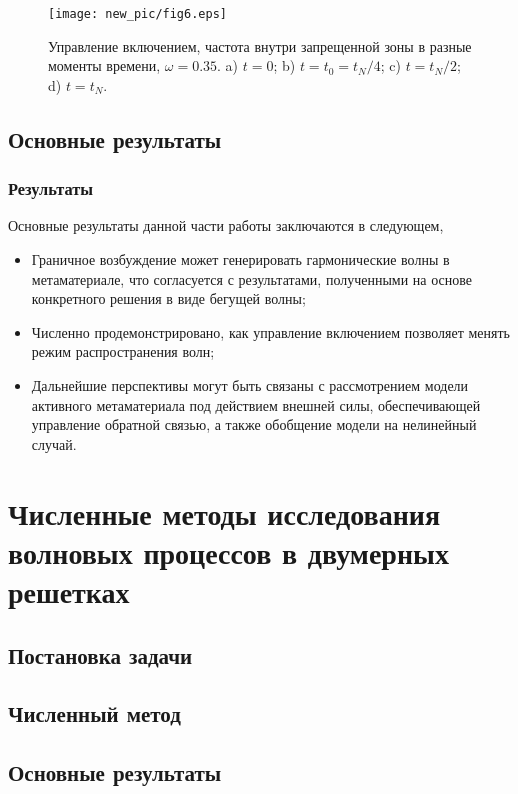 \begin{frame}
	\begin{figure}
		\begin{center}
			\texttt{[image: new\_pic/fig6.eps]}
		\end{center}
		Управление включением, частота внутри запрещенной зоны в разные моменты времени, $\omega = 0.35$.  a) $t=0$; b) $ t=t_0=t_N/4$; c) $t=t_N/2$; d) $t=t_N$.
	\end{figure}
\end{frame}

\subsection{Основные результаты}
\begin{frame}
	\frametitle{Результаты}
	Основные результаты данной части работы заключаются в следующем,
	\begin{itemize}
		\item{Граничное возбуждение может генерировать гармонические волны в метаматериале, что согласуется с результатами, полученными на основе конкретного решения в виде бегущей волны;}
		\item{Численно продемонстрировано, как управление включением позволяет менять режим распространения волн;}
		\item{Дальнейшие перспективы могут быть связаны с рассмотрением модели активного метаматериала под действием внешней силы, обеспечивающей управление обратной связью, а также обобщение модели на нелинейный случай.}
	\end{itemize}
\end{frame}

\section{Численные методы исследования волновых процессов в двумерных решетках}
\subsection{Постановка задачи}
\subsection{Численный метод}
\subsection{Основные результаты}

